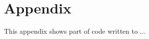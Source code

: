 
\thispagestyle{empty}

\chapter{Appendix}
\label{appendixA}

This appendix shows part of code written to $\hdots$
